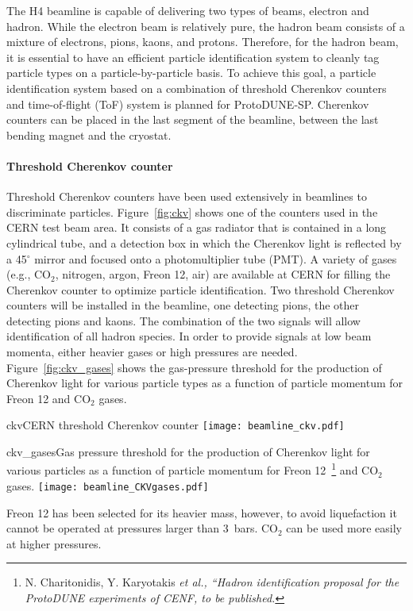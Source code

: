 The H4 beamline is capable of delivering two types of beams, electron and hadron. %
While the electron beam is relatively pure, the hadron beam consists of a mixture of electrons, pions, kaons, and protons. Therefore, for the hadron beam, it is essential to have an efficient particle identification system to cleanly tag particle types on a particle-by-particle basis. To achieve this goal, a particle identification system based on a combination of threshold Cherenkov counters and time-of-flight (ToF) system is planned for ProtoDUNE-SP. 
Cherenkov counters can be placed in the last segment of the beamline, between the last bending magnet and the cryostat. 

\paragraph{Threshold Cherenkov counter}
Threshold Cherenkov counters have been used extensively in beamlines to discriminate particles. Figure~\ref{fig:ckv} shows one of the counters used in the CERN test beam area. It consists of a gas radiator that is contained in a long cylindrical tube, and a detection box in which the Cherenkov light is reflected by a 45$^\circ$ mirror and focused onto a photomultiplier tube (PMT). 
A variety of gases (e.g., CO$_2$, nitrogen, argon, Freon 12, air) are available at CERN for filling the Cherenkov counter to optimize particle identification. 
Two threshold Cherenkov counters will be installed in the beamline, one detecting pions, the other detecting pions 
and kaons. The combination of the two signals will allow identification of all hadron species. In order to provide signals at low beam momenta, either heavier gases or high pressures are needed.
Figure~\ref{fig:ckv_gases} shows the gas-pressure threshold 
for the production of Cherenkov light for various particle types as a function of particle momentum for Freon 12 and CO$_2$ gases.
\begin{cdrfigure}{ckv}{CERN threshold Cherenkov counter}
  \texttt{[image: beamline\_ckv.pdf]}
\end{cdrfigure}
\begin{cdrfigure}{ckv_gases}{Gas pressure threshold for the production of Cherenkov light for various particles as a function of particle momentum for Freon 12~\footnote{N. Charitonidis, Y. Karyotakis \it{et al.}, ``Hadron identification proposal for the ProtoDUNE experiments of CENF, to be published.} and CO$_2$ gases.}
  \texttt{[image: beamline\_CKVgases.pdf]}
\end{cdrfigure}
Freon 12 has been selected for its heavier mass, however,  to avoid liquefaction it cannot be operated at pressures larger than 3~bars.  CO$_2$ can be used more easily at higher pressures.  

